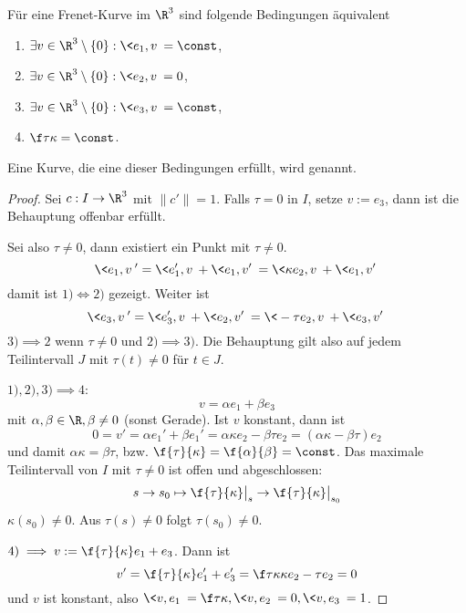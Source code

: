 \begin{st}[Böschungslinien]
	Für eine Frenet-Kurve im $\R^3$ sind folgende Bedingungen äquivalent
	\begin{enumerate}[1)]
		\item
			$\exists v \in \R^3 \setminus \{0\} : \<e_1, v\> = \const$,
		\item
			$\exists v \in \R^3 \setminus \{0\} : \<e_2, v\> = 0$,
		\item
			$\exists v \in \R^3 \setminus \{0\} : \<e_3, v\> = \const$,
		\item
			$\f \tau\kappa = \const$.
	\end{enumerate}
	Eine Kurve, die eine dieser Bedingungen erfüllt, wird  genannt.
	\begin{proof}
		Sei $c: I \to \R^3$ mit $\|c'\| = 1$.
		Falls $\tau = 0$ in $I$, setze $v := e_3$, dann ist die Behauptung offenbar erfüllt.

		Sei also $\tau \neq 0$, dann existiert ein Punkt mit $\tau \neq 0$.
		\[
			\<e_1, v\>' = \<e_1', v\> + \<e_1, v'\>
			= \<\kappa e_2, v\> + \<e_1, v'\>
		\]
		damit ist $1) \iff 2)$ gezeigt.
		Weiter ist
		\[
			\<e_3, v\>' = \<e_3', v\> + \<e_2, v'\>
			= \<-\tau e_2, v\> + \<e_3, v'\>
		\]
		$3) \implies 2$ wenn $\tau \neq 0$ und $2) \implies 3)$.
		Die Behauptung gilt also auf jedem Teilintervall $J$ mit $\tau(t) \neq 0$ für $t \in J$.

		$1), 2), 3) \implies 4$:
		\[
			v = \alpha e_1 + \beta e_3
		\]
		mit $\alpha, \beta \in \R, \beta \neq 0$ (sonst Gerade).
		Ist $v$ konstant, dann ist
		\[
			0 = v' = \alpha e_1' + \beta e_1'
			= \alpha \kappa e_2 - \beta \tau e_2
			= (\alpha \kappa - \beta \tau) e_2
		\]
		und damit $\alpha \kappa = \beta \tau$, bzw. $\f{\tau}{\kappa} = \f{\alpha}{\beta} = \const$.
		Das maximale Teilintervall von $I$ mit $\tau \neq 0$ ist offen und abgeschlossen:
		\[
			s \to s_0 \mapsto \f {\tau}{\kappa} \big|_s \to \f{\tau}{\kappa}\big|_{s_0}
		\]
		$\kappa(s_0) \neq 0$.
		Aus $\tau(s) \neq 0$ folgt $\tau (s_0) \neq 0$.

		$4) \implies v := \f{\tau}{\kappa} e_1 + e_3$.
		Dann ist
		\[
			v' = \f{\tau}{\kappa} e_1' + e_3'
			= \f \tau\kappa \kappa e_2 - \tau e_2
			= 0
		\]
		und $v$ ist konstant, also $\<v, e_1\> = \f \tau\kappa, \<v,e_2\> = 0, \<v, e_3\> = 1$.
	\end{proof}
\end{st}






